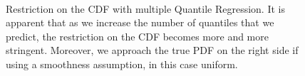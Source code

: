 \begin{figure}
    \centering
    \\

    \caption[Restriction on the CDF with multiple Quantile Regression]{Restriction on the CDF with multiple Quantile Regression. It is apparent that as we increase the number of quantiles that we predict, the restriction on the CDF becomes more and more stringent. Moreover, we approach the true PDF on the right side if using a smoothness assumption, in this case uniform.}
\end{figure}

